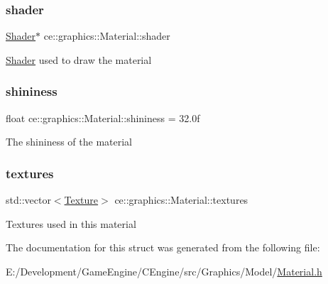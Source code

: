 \subsubsection{\texorpdfstring{shader}{shader}}
{\footnotesize\ttfamily \hyperlink{classce_1_1graphics_1_1_shader}{Shader}$\ast$ ce\+::graphics\+::\+Material\+::shader}

\hyperlink{classce_1_1graphics_1_1_shader}{Shader} used to draw the material \mbox{\label{structce_1_1graphics_1_1_material_a62ed7d4af263dbdd7065a9b664bfab6e}} 
\subsubsection{\texorpdfstring{shininess}{shininess}}
{\footnotesize\ttfamily float ce\+::graphics\+::\+Material\+::shininess = 32.\+0f}

The shininess of the material \mbox{\label{structce_1_1graphics_1_1_material_ad14fc2a8d3a7d9241226471f8f2e2fcc}} 
\subsubsection{\texorpdfstring{textures}{textures}}
{\footnotesize\ttfamily std\+::vector$<$\hyperlink{structce_1_1graphics_1_1_texture}{Texture}$>$ ce\+::graphics\+::\+Material\+::textures}

Textures used in this material 

The documentation for this struct was generated from the following file\+:\begin{DoxyCompactItemize}
\item 
E\+:/\+Development/\+Game\+Engine/\+C\+Engine/src/\+Graphics/\+Model/\hyperlink{_material_8h}{Material.\+h}\end{DoxyCompactItemize}
